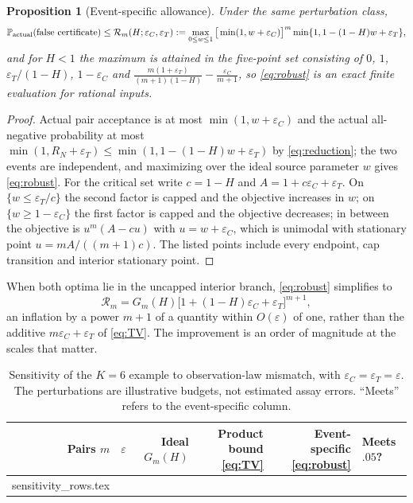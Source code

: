 \documentclass[11pt]{article}
\makeatletter
\let\tableinput\@@input
\newtheorem{proposition}[theorem]{Proposition}
\theoremstyle{remark}\newtheorem{remark}[theorem]{Remark}
\newcommand{\Prob}{\mathbb P}
\makeatother
\begin{document}
\begin{proposition}[Event-specific allowance]\label{prop:robust}
Under the same perturbation class,
\begin{equation}\label{eq:robust}
\Prob_{\rm actual}(\text{false certificate})\le
\mathcal R_m(H;\varepsilon_C,\varepsilon_T):=\max_{0\le w\le1}
\big[\min(1,w+\varepsilon_C)\big]^m\min\{1,1-(1-H)w+\varepsilon_T\},
\end{equation}
and for $H<1$ the maximum is attained in the five-point set consisting of $0$,
$1$, $\varepsilon_T/(1-H)$, $1-\varepsilon_C$ and
$\frac{m(1+\varepsilon_T)}{(m+1)(1-H)}-\frac{\varepsilon_C}{m+1}$, so
\eqref{eq:robust} is an exact finite evaluation for rational inputs.
\end{proposition}
\begin{proof}
Actual pair acceptance is at most $\min(1,w+\varepsilon_C)$ and the actual
all-negative probability at most $\min(1,R_N+\varepsilon_T)\le
\min(1,1-(1-H)w+\varepsilon_T)$ by \eqref{eq:reduction}; the two events are
independent, and maximizing over the ideal source parameter $w$ gives
\eqref{eq:robust}. For the critical set write $c=1-H$ and $A=1+c\varepsilon_C
+\varepsilon_T$. On $\{w\le\varepsilon_T/c\}$ the second factor is capped and the
objective increases in $w$; on $\{w\ge1-\varepsilon_C\}$ the first factor is
capped and the objective decreases; in between the objective is
$u^m(A-cu)$ with $u=w+\varepsilon_C$, which is unimodal with stationary point
$u=mA/((m+1)c)$. The listed points include every endpoint, cap transition and
interior stationary point.
\end{proof}

When both optima lie in the uncapped interior branch, \eqref{eq:robust}
simplifies to
\begin{equation}\label{eq:robustclosed}
\mathcal R_m=G_m(H)\big[1+(1-H)\varepsilon_C+\varepsilon_T\big]^{m+1},
\end{equation}
an inflation by a power $m+1$ of a quantity within $O(\varepsilon)$ of one,
rather than the additive $m\varepsilon_C+\varepsilon_T$ of \eqref{eq:TV}. The
improvement is an order of magnitude at the scales that matter.

\begin{table}[tb]
\centering\small
\caption{Sensitivity of the $K=6$ example to observation-law mismatch, with
$\varepsilon_C=\varepsilon_T=\varepsilon$. The perturbations are illustrative
budgets, not estimated assay errors. ``Meets'' refers to the event-specific
column.}
\label{tab:sensitivity}
\begin{tabular}{@{}rrrrrl@{}}\toprule
Pairs $m$ & $\varepsilon$ & Ideal $G_m(H)$ & Product bound \eqref{eq:TV}
& Event-specific \eqref{eq:robust} & Meets $.05$?\\\midrule
\tableinput sensitivity_rows.tex
\bottomrule\end{tabular}
\end{table}
\end{document}
